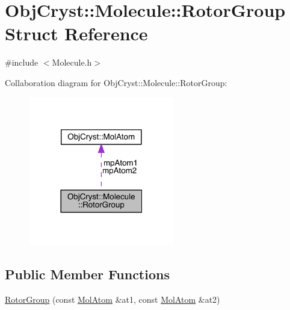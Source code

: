 \hypertarget{struct_obj_cryst_1_1_molecule_1_1_rotor_group}{}\section{Obj\+Cryst\+::Molecule\+::Rotor\+Group Struct Reference}
\label{struct_obj_cryst_1_1_molecule_1_1_rotor_group}


{\ttfamily \#include $<$Molecule.\+h$>$}



Collaboration diagram for Obj\+Cryst\+::Molecule\+::Rotor\+Group\+:
\nopagebreak
\begin{figure}[H]
\begin{center}
\leavevmode
\includegraphics[width=180pt]{struct_obj_cryst_1_1_molecule_1_1_rotor_group__coll__graph}
\end{center}
\end{figure}
\subsection*{Public Member Functions}
\begin{DoxyCompactItemize}
\item 
\mbox{\hyperlink{struct_obj_cryst_1_1_molecule_1_1_rotor_group_a04efc612bcdfd3c84132e6dc0c54bf92}{Rotor\+Group}} (const \mbox{\hyperlink{class_obj_cryst_1_1_mol_atom}{Mol\+Atom}} \&at1, const \mbox{\hyperlink{class_obj_cryst_1_1_mol_atom}{Mol\+Atom}} \&at2)
\end{DoxyCompactItemize}
